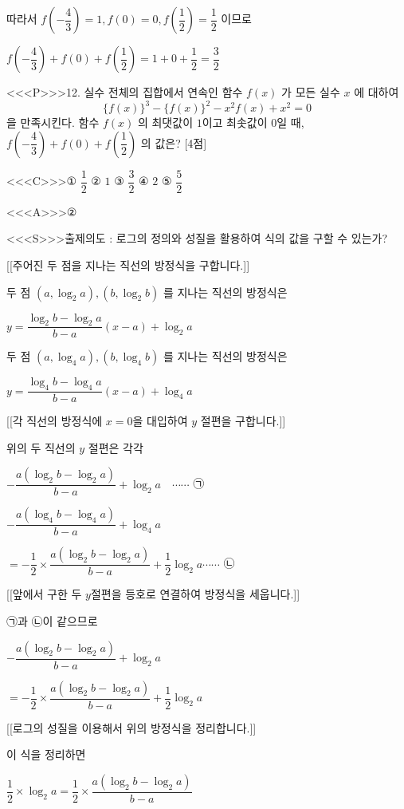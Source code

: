 \documentclass{oblivoir}
\begin{document}
따라서 $f\left(-\dfrac{4}{3}\right)=1, f(0)=0, f\left(\dfrac{1}{2}\right)=\dfrac{1}{2}$ 이므로

$f\left(-\dfrac{4}{3}\right)+f(0)+f\left(\dfrac{1}{2}\right)=1+0+\dfrac{1}{2}=\dfrac{3}{2}$

<<<P>>>12. 실수 전체의 집합에서 연속인 함수 $f(x)$ 가 모든 실수 $x$ 에 대하여
$$
\{f(x)\}^{3}-\{f(x)\}^{2}-x^{2} f(x)+x^{2}=0
$$
을 만족시킨다. 함수 $f(x)$ 의 최댓값이 $1$이고 최솟값이 $0$일 때, $f\left(-\dfrac{4}{3}\right)+f(0)+f\left(\dfrac{1}{2}\right)$ 의 값은? [4점]

<<<C>>>① $\dfrac{1}{2}$
② $1$
③ $\dfrac{3}{2}$
④ $2$
⑤ $\dfrac{5}{2}$

<<<A>>>②

<<<S>>>출제의도 : 로그의 정의와 성질을 활용하여 식의 값을 구할 수 있는가?

[[주어진 두 점을 지나는 직선의 방정식을 구합니다.]]

두 점 $\left(a, \log _{2} a\right),\left(b, \log _{2} b\right)$ 를 지나는 직선의 방정식은

$y=\dfrac{\log _{2} b-\log _{2} a}{b-a}(x-a)+\log _{2} a $

두 점 $\left(a, \log _{4} a\right),\left(b, \log _{4} b\right)$ 를 지나는 직선의 방정식은

$y=\dfrac{\log _{4} b-\log _{4} a}{b-a}(x-a)+\log _{4} a $



[[각 직선의 방정식에 $x=0$을 대입하여 $y$ 절편을 구합니다.]]

위의 두 직선의 $y$ 절편은 각각

$-\dfrac{a\left(\log _{2} b-\log _{2} a\right)}{b-a}+\log _{2} a \quad \cdots \cdots$ ㉠

$-\dfrac{a\left(\log _{4} b-\log _{4} a\right)}{b-a}+\log _{4} a$

$=-\dfrac{1}{2} \times \dfrac{a\left(\log _{2} b-\log _{2} a\right)}{b-a}+\dfrac{1}{2} \log _{2} a \cdots \cdots $ ㉡

[[앞에서 구한 두 $y$절편을 등호로 연결하여 방정식을 세웁니다.]]

㉠과 ㉡이 같으므로

$-\dfrac{a\left(\log _{2} b-\log _{2} a\right)}{b-a}+\log _{2} a$

$=-\dfrac{1}{2} \times \dfrac{a\left(\log _{2} b-\log _{2} a\right)}{b-a}+\dfrac{1}{2} \log _{2} a$

[[로그의 성질을 이용해서 위의 방정식을 정리합니다.]]

이 식을 정리하면

$\dfrac{1}{2} \times \log _{2} a=\dfrac{1}{2} \times \dfrac{a\left(\log _{2} b-\log _{2} a\right)}{b-a}$
\end{document}
